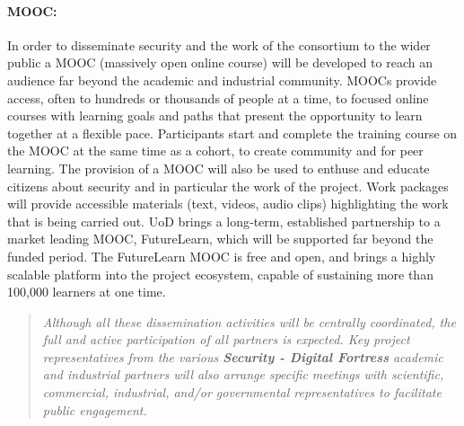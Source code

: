 \documentclass[a4paper,11pt]{article}
\newcommand{\project}[1]{\textbf{#1}\xspace}
\newcommand{\SECURITY}{\project{Security - Digital Fortress}}
\newcommand{\TheProject}{\SECURITY}
\begin{document}
 \paragraph{MOOC:}In order to disseminate security and the work of the consortium to the wider public a MOOC (massively open online course) will be developed to reach an audience far beyond the academic and industrial community.  MOOCs provide access, often to hundreds or thousands of people at a time, to focused online courses with learning goals and paths that present the opportunity to learn together at a flexible pace. Participants start and complete the training course on the MOOC at the same time as a cohort, to create community and for peer learning. The provision of a MOOC will also be
used to enthuse and educate citizens about security and in particular the work of the project.  Work packages will provide accessible materials (text, videos, audio clips) highlighting the work that is being carried out. UoD brings a long‐term, established partnership to a market leading MOOC, FutureLearn, which will be supported far beyond the funded period. The FutureLearn MOOC is free and open, and brings a highly scalable platform into the project ecosystem, capable of sustaining more than 100,000 learners at one time.


\begin{quote}

\emph{Although all these dissemination activities
will be centrally coordinated, the full and active participation of
all partners is expected. Key project representatives from
the various \TheProject{} academic and industrial
partners will also arrange specific meetings
with scientific, commercial, industrial, and/or
governmental representatives to facilitate public
engagement.}
\end{quote}
\end{document}
